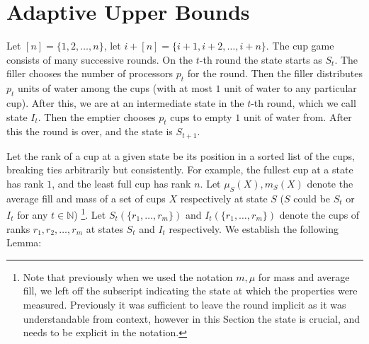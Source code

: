 \documentclass[twocolumn]{article}[11pt]
\begin{document}
\section{Adaptive Upper Bounds}\label{sec:adaptiveUpperBound}
Let $[n] = \{1,2,\ldots, n\}$, let $i+[n] = \{i+1, i+2, \ldots, i+n\}$.
The cup game consists of many successive rounds. On the $t$-th round the state
starts as $S_t$. The filler chooses the number of processors $p_t$ for the round. 
Then the filler distributes $p_t$ units of water among the cups (with at most
$1$ unit of water to any particular cup). After this, we are at an intermediate
state in the $t$-th round, which we call state $I_t$. Then the emptier chooses
$p_t$ cups to empty $1$ unit of water from. After this the round is over, and
the state is $S_{t+1}$.

Let the rank of a cup at a given state be its position in a sorted list of the
cups, breaking ties arbitrarily but consistently. For example, the fullest cup
at a state has rank $1$, and the least full cup has rank $n$.
Let $\mu_S(X), m_S(X)$ denote the average fill and mass of a set of cups $X$
respectively at state $S$ ($S$ could be $S_t$ or $I_t$ for any $t\in\mathbb{N}$)
\footnote{Note that previously when we used the notation $m, \mu$ for mass and
average fill, we left off the subscript indicating the state at which the
properties were measured. Previously it was sufficient to leave the round
implicit as it was understandable from context, however in this Section the
state is crucial, and needs to be explicit in the notation.}.
Let $S_t(\{r_1, \ldots, r_m\})$ and $I_t(\{r_1,\ldots, r_m\})$ denote the cups
of ranks $r_1, r_2, \ldots, r_m$ at states $S_t$ and $I_t$ respectively.
We establish the following Lemma:
\end{document}
